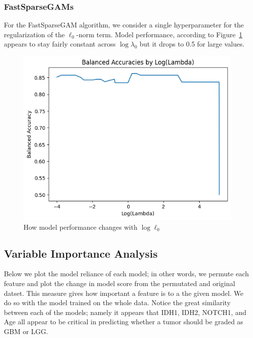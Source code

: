 \documentclass[12pt]{article}
\newtheorem{Proof of Lemma}{Proof of Lemma}
\begin{document}
\subsubsection{FastSparseGAMs}
For the FastSparseGAM algorithm, we consider a single hyperparameter for the regularization of the $\ell_0$-norm term.
Model performance, according to Figure~\ref{fig:fsg} appears to stay fairly constant across $\log\lambda_0$ but it drops to 0.5 for large values.
\begin{figure}[h!]
  \centering
  \includegraphics[scale = 0.5]{fsg.png}
  \caption{How model performance changes with $\log \ell_0$}
  \label{fig:fsg}
\end{figure}

\subsection{Variable Importance Analysis}

Below we plot the model reliance of each model; in other words, we permute each 
feature and plot the change in model score from the permutated and original datset.
This measure gives how important a feature is to a the given model. We do so with the
model trained on the whole data. Notice the great similarity between each of the models;
namely it appears that IDH1, IDH2, NOTCH1, and Age all appear to be critical in predicting 
whether a tumor should be graded as GBM or LGG.
\end{document}

